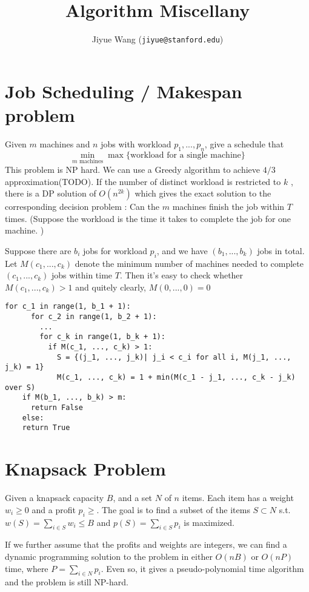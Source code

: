 \documentclass[11pt]{article}
\title{Algorithm Miscellany}
\author{Jiyue Wang (\texttt{jiyue@stanford.edu})}
\begin{document}
\maketitle

\section{Job Scheduling / Makespan problem}
  Given $m$ machines and $n$ jobs with workload $p_1, ..., p_n$, give a schedule that 
    \[
      \min_{\text{$m$ machines}} \max \{ \text{workload for a single machine}\}
    \]
  This problem is NP hard. We can use a Greedy algorithm to achieve $4/3$ approximation(TODO). If the number of distinct workload is restricted to $k$ , there is a DP solution of $O(n^{2k})$ which gives the exact solution to the corresponding decision problem : Can the $m$ machines finish the job within $T$ times. (Suppose the workload is the time it takes to complete the job for one machine. )

  Suppose there are $b_i$ jobs for workload $p_i$, and we have $(b_1, ..., b_k)$ jobs in total. Let $M(c_1, ..., c_k)$ denote the minimum number of machines needed to complete $(c_1, ..., c_k)$ jobs within time $T$. Then it's easy to check whether $M(c_1, ..., c_k) > 1$ and quitely clearly, $M(0, ..., 0) = 0$

  \begin{lstlisting}[frame=single]
    for c_1 in range(1, b_1 + 1):
      for c_2 in range(1, b_2 + 1):
        ...
        for c_k in range(1, b_k + 1):
          if M(c_1, ..., c_k) > 1:
            S = {(j_1, ..., j_k)| j_i < c_i for all i, M(j_1, ..., j_k) = 1}
            M(c_1, ..., c_k) = 1 + min(M(c_1 - j_1, ..., c_k - j_k) over S)
    if M(b_1, ..., b_k) > m:
      return False
    else:
    return True
  \end{lstlisting}

\section{Knapsack Problem}
  Given a knapsack capacity $B$, and a set $N$ of $n$ items. Each item has a weight $w_i \ge 0$ and a profit $p_i \ge$. The goal is to find a subset of the items $S \subset N$ s.t. $w(S) = \sum_{i \in S} w_i \le B$ and $p(S) = \sum_{i \in S} p_i$ is maximized. 

  If we further assume that the profits and weights are integers, we can find a dynamic programming solution to the problem in either $O(nB)$ or $O(nP)$ time, where $P = \sum_{i \in N}p_i$. Even so, it gives a pseudo-polynomial time algorithm and the problem is still NP-hard.
\end{document}
